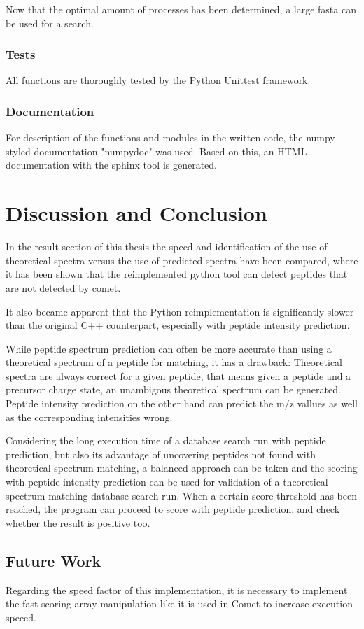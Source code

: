 \documentclass[11pt]{article}
\begin{document}
Now that the optimal amount of processes has been determined, a large fasta can be used for a search.

\subsubsection{Tests}
All functions are thoroughly tested by the Python Unittest framework.

\subsubsection{Documentation}
For description of the functions and modules in the written code, the numpy styled documentation "numpydoc" was used. Based on this, an HTML documentation with the sphinx tool is generated.

\section{Discussion and Conclusion}
In the result section of this thesis the speed and identification of the use of theoretical spectra versus the use of predicted spectra have been compared, where it has been shown that the reimplemented python tool can detect peptides that are not detected by comet.

It also became apparent that the Python reimplementation is significantly slower than the original C++ counterpart, especially with peptide intensity prediction.

While peptide spectrum prediction can often be more accurate than using a theoretical spectrum of a peptide for matching,
it has a drawback: Theoretical spectra are always correct for a given peptide, that means given a peptide and a precursor charge state, an unambigous theoretical spectrum can be generated. Peptide intensity prediction on the other hand can predict the m/z vallues as well as the corresponding intensities wrong.

Considering the long execution time of a database search run with peptide prediction, but also its advantage of uncovering peptides not found with theoretical spectrum matching, a balanced approach can be taken and the scoring with peptide intensity prediction can be used for validation of a theoretical spectrum matching database search run. When a certain score threshold has been reached, the program can proceed to score with peptide prediction, and check whether the result is positive too.

\subsection{Future Work}
Regarding the speed factor of this implementation, it is necessary to implement the fast scoring array manipulation like it is used in Comet to increase execution speeed. 
\end{document}
